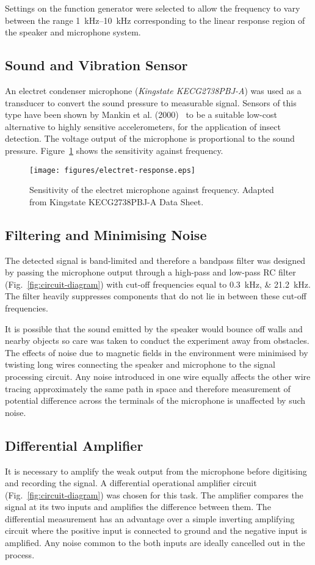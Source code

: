 \documentclass[twocolumn]{article}
\begin{document}
Settings on the function generator were selected to allow the frequency to vary between the range \SIrange{1}{10}{\kilo\hertz} corresponding to the linear response region of the speaker and microphone system.

\subsection{Sound and Vibration Sensor}
An electret condenser microphone (\textit{Kingstate KECG2738PBJ-A}) was used as a transducer to convert the sound pressure to measurable signal. Sensors of this type have been shown by Mankin et al. (2000)~\cite{mankin_hubbard_weaver_2000} to be a suitable low-cost alternative to highly sensitive accelerometers, for the application of insect detection. The voltage output of the microphone is proportional to the sound pressure. Figure~\ref{fig:electret-response} shows the sensitivity against frequency.

\begin{figure}
    \centering
    \texttt{[image: figures/electret-response.eps]}
    \caption{Sensitivity of the electret microphone against frequency. Adapted from Kingstate KECG2738PBJ-A Data Sheet.}
    \label{fig:electret-response}
\end{figure}

\subsection{Filtering and Minimising Noise}
The detected signal is band-limited and therefore a bandpass filter was designed by passing the microphone output through a high-pass and low-pass RC filter (Fig.~\ref{fig:circuit-diagram}) with cut-off frequencies equal to \SIlist{0.3;21.2}{\kilo\hertz}. The filter heavily suppresses components that do not lie in between these cut-off frequencies.

It is possible that the sound emitted by the speaker would bounce off walls and nearby objects so care was taken to conduct the experiment away from obstacles. The effects of noise due to magnetic fields in the environment were minimised by twisting long wires connecting the speaker and microphone to the signal processing circuit. Any noise introduced in one wire equally affects the other wire tracing approximately the same path in space and therefore measurement of potential difference across the terminals of the microphone is unaffected by such noise.

\subsection{Differential Amplifier}
It is necessary to amplify the weak output from the microphone before digitising and recording the signal. A differential operational amplifier circuit (Fig.~\ref{fig:circuit-diagram}) was chosen for this task. The amplifier compares the signal at its two inputs and amplifies the difference between them. The differential measurement has an advantage over a simple inverting amplifying circuit where the positive input is connected to ground and the negative input is amplified. Any noise common to the both inputs are ideally cancelled out in the process.
\end{document}
